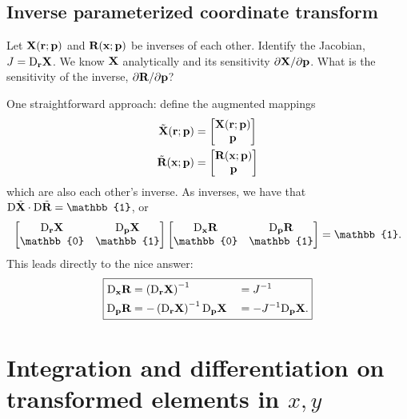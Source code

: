 \subsection{Inverse parameterized coordinate transform}

Let $\textbf{X}(\textbf{r}; \textbf{p})$ and $\textbf{R}(\textbf{x}; \textbf{p})$ be inverses of each other.  
Identify the Jacobian, $J = \text{D}_{\textbf{r}} \textbf{X}$.  We know $\textbf{X}$ analytically and its sensitivity $\partial{\textbf{X}}/\partial{\textbf{p}}$.  What is the sensitivity of the inverse, $\partial{\textbf{R}}/\partial{\textbf{p}}$?

One straightforward approach: define the augmented mappings
%
\begin{equation}
\begin{aligned}
\tilde{\textbf{X}}(\textbf{r}; \textbf{p}) &= \begin{bmatrix} \textbf{X}(\textbf{r}; \textbf{p}) \\ \textbf{p} \end{bmatrix} \\
\tilde{\textbf{R}}(\textbf{x}; \textbf{p}) &= \begin{bmatrix} \textbf{R}(\textbf{x}; \textbf{p}) \\ \textbf{p} \end{bmatrix}
\end{aligned}
\end{equation}
%
which are also each other's inverse.  As inverses, we have that $\D \tilde{\ve X} \cdot \D \tilde{\ve R} = \mathbb{1}$, or
%
\begin{equation}
\begin{bmatrix} \D_{\ve r} \ve X & \D_{\ve p} \ve X \\ \mathbb{0} & \mathbb{1} \end{bmatrix}
\begin{bmatrix} \D_{\ve x} \ve R & \D_{\ve p} \ve R \\ \mathbb{0} & \mathbb{1} \end{bmatrix}
= \mathbb{1}.
\end{equation}
%
This leads directly to the nice answer:
%
\begin{equation}
\label{eqn:inverse_transformation_derivative}
\boxed{
\begin{aligned}
\text{D}_{\textbf{x}} \textbf{R} &= \left( \text{D}_{\textbf{r}} \textbf{X} \right)^{-1} &&= J^{-1}\\
\text{D}_{\textbf{p}} \textbf{R} &= - \left( \text{D}_{\textbf{r}} \textbf{X} \right)^{-1} \text{D}_{\textbf{p}} \textbf{X} &&= -J^{-1} \text{D}_{\textbf{p}} \textbf{X}.
\end{aligned}
}
\end{equation}

\section{Integration and differentiation on transformed elements in $x,y$}


